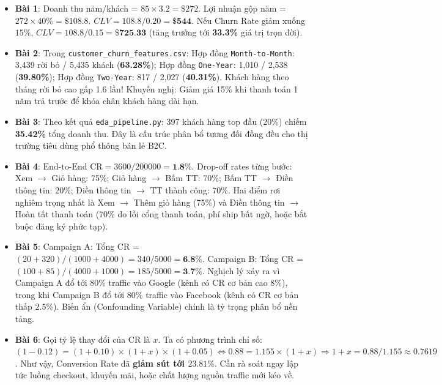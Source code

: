\begin{dapanbox}
\begin{itemize}
    \item \textbf{Bài 1}: Doanh thu năm/khách = $85 \times 3.2 = \$272$. Lợi nhuận gộp năm = $272 \times 40\% = \$108.8$. $CLV = 108.8 / 0.20 = \textbf{\$544}$. Nếu Churn Rate giảm xuống $15\%$, $CLV = 108.8 / 0.15 = \textbf{\$725.33}$ (tăng trưởng tới \textbf{33.3\%} giá trị trọn đời).
    \item \textbf{Bài 2}: Trong \texttt{customer\_churn\_features.csv}: Hợp đồng \texttt{Month-to-Month}: 3,439 rời bỏ / 5,435 khách (\textbf{63.28\%}); Hợp đồng \texttt{One-Year}: 1,010 / 2,538 (\textbf{39.80\%}); Hợp đồng \texttt{Two-Year}: 817 / 2,027 (\textbf{40.31\%}). Khách hàng theo tháng rời bỏ cao gấp 1.6 lần! Khuyến nghị: Giảm giá 15\% khi thanh toán 1 năm trả trước để khóa chân khách hàng dài hạn.
    \item \textbf{Bài 3}: Theo kết quả \texttt{eda\_pipeline.py}: 397 khách hàng top đầu (20\%) chiếm \textbf{35.42\%} tổng doanh thu. Đây là cấu trúc phân bổ tương đối đồng đều cho thị trường tiêu dùng phổ thông bán lẻ B2C.
    \item \textbf{Bài 4}: $\text{End-to-End CR} = 3600 / 200000 = \textbf{1.8\%}$. Drop-off rates từng bước: Xem $\rightarrow$ Giỏ hàng: 75\%; Giỏ hàng $\rightarrow$ Bấm TT: 70\%; Bấm TT $\rightarrow$ Điền thông tin: 20\%; Điền thông tin $\rightarrow$ TT thành công: 70\%. Hai điểm rơi nghiêm trọng nhất là Xem $\rightarrow$ Thêm giỏ hàng (75\%) và Điền thông tin $\rightarrow$ Hoàn tất thanh toán (70\% do lỗi cổng thanh toán, phí ship bất ngờ, hoặc bắt buộc đăng ký phức tạp).
    \item \textbf{Bài 5}: Campaign A: Tổng CR = $(20 + 320)/(1000 + 4000) = 340/5000 = \textbf{6.8\%}$. Campaign B: Tổng CR = $(100 + 85)/(4000 + 1000) = 185/5000 = \textbf{3.7\%}$. Nghịch lý xảy ra vì Campaign A đổ tới 80\% traffic vào Google (kênh có CR cơ bản cao $8\%$), trong khi Campaign B đổ tới 80\% traffic vào Facebook (kênh có CR cơ bản thấp $2.5\%$). Biến ẩn (Confounding Variable) chính là tỷ trọng phân bổ nền tảng.
    \item \textbf{Bài 6}: Gọi tỷ lệ thay đổi của CR là $x$. Ta có phương trình chỉ số: $(1 - 0.12) = (1 + 0.10) \times (1 + x) \times (1 + 0.05) \Leftrightarrow 0.88 = 1.155 \times (1 + x) \Rightarrow 1 + x = 0.88 / 1.155 \approx 0.7619$. Như vậy, Conversion Rate đã \textbf{giảm sút tới $23.81\%$}. Cần rà soát ngay lập tức luồng checkout, khuyến mãi, hoặc chất lượng nguồn traffic mới kéo về.

\end{itemize}
\end{dapanbox}
